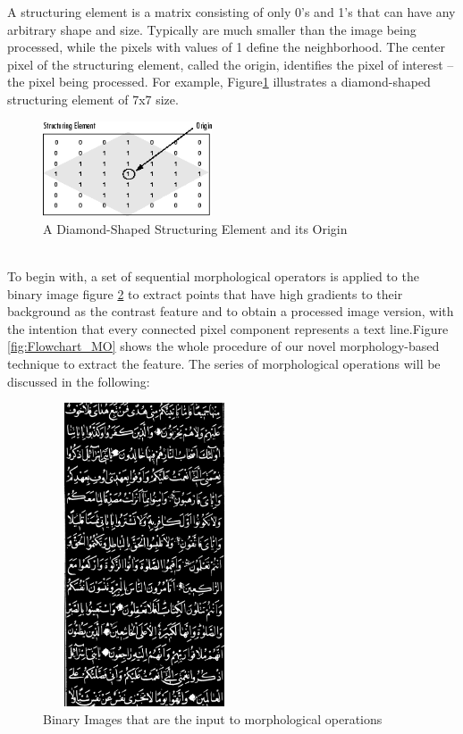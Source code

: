 \noindent
A structuring element is a matrix consisting of only 0's and 1's that can have any arbitrary shape and size. Typically are much smaller than the image being processed, while the pixels with values of 1 define the neighborhood. The center pixel of the structuring element, called the origin, identifies the pixel of interest – the pixel being processed.
\noindent
For example, Figure\ref{fig:structuring-element} illustrates a diamond-shaped structuring element of 7x7 size.
\begin{figure}[!htb]
    \centering
    \includegraphics[width=5cm]{images/SE.png}
    \caption{A Diamond-Shaped Structuring Element and its Origin}
    \label{fig:structuring-element}
\end{figure} \\


To begin with, a set of sequential morphological operators is applied to the binary image figure \ref{fig:input_binary_img} to extract points that have high gradients to their background as the contrast feature and to obtain a processed image version, with the intention that every connected pixel component represents a text line.Figure \ref{fig:Flowchart_MO} shows the whole procedure of our novel morphology-based technique to extract the feature. The series of morphological operations will be discussed in the following:%
\begin{figure}[H]
    \centering
    \includegraphics[width=6cm, height=9cm]{images/input.png}
    \caption{Binary Images that are the input to morphological operations}
    \label{fig:input_binary_img}
\end{figure}

